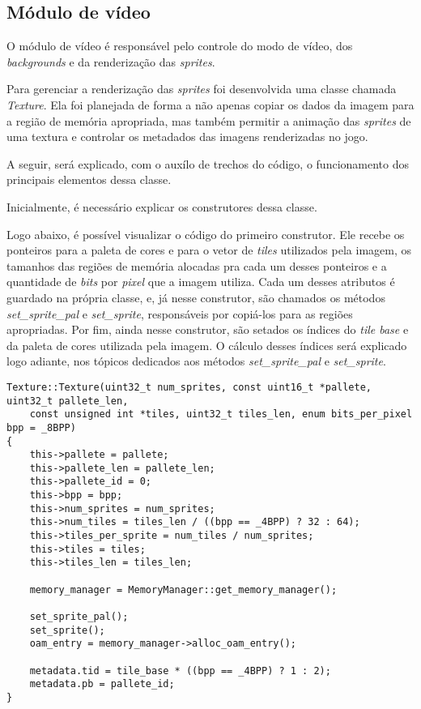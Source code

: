 \subsection{Módulo de vídeo}

O módulo de vídeo é responsável pelo controle do modo de vídeo, dos \textit{backgrounds} e da renderização das \textit{sprites}.

Para gerenciar a renderização das \textit{sprites} foi desenvolvida uma classe chamada \textit{Texture}. Ela foi planejada de forma a não apenas copiar os dados da imagem para a região de memória apropriada, mas também permitir a animação das \textit{sprites} de uma textura e controlar os metadados das imagens renderizadas no jogo.

A seguir, será explicado, com o auxílo de trechos do código, o funcionamento dos principais elementos dessa classe.

Inicialmente, é necessário explicar os construtores dessa classe.

Logo abaixo, é possível visualizar o código do primeiro construtor. Ele recebe os ponteiros para a paleta de cores e para o vetor de \textit{tiles} utilizados pela imagem, os tamanhos das regiões de memória alocadas pra cada um desses ponteiros e a quantidade de \textit{bits} por \textit{pixel} que a imagem utiliza. Cada um desses atributos é guardado na própria classe, e, já nesse construtor, são chamados os métodos \textit{set\_sprite\_pal} e \textit{set\_sprite}, responsáveis por copiá-los para as regiões apropriadas. Por fim, ainda nesse construtor, são setados os índices do \textit{tile base} e da paleta de cores utilizada pela imagem. O cálculo desses índices será explicado logo adiante, nos tópicos dedicados aos métodos \textit{set\_sprite\_pal} e \textit{set\_sprite}.

\begin{lstlisting}[float,caption={Construtor da classe \textit{Texture}.}]
Texture::Texture(uint32_t num_sprites, const uint16_t *pallete, uint32_t pallete_len,
    const unsigned int *tiles, uint32_t tiles_len, enum bits_per_pixel bpp = _8BPP)
{
    this->pallete = pallete;
    this->pallete_len = pallete_len;
    this->pallete_id = 0;
    this->bpp = bpp;
    this->num_sprites = num_sprites;
    this->num_tiles = tiles_len / ((bpp == _4BPP) ? 32 : 64);
    this->tiles_per_sprite = num_tiles / num_sprites;
    this->tiles = tiles;
    this->tiles_len = tiles_len;

    memory_manager = MemoryManager::get_memory_manager();

    set_sprite_pal();
    set_sprite();
    oam_entry = memory_manager->alloc_oam_entry();

    metadata.tid = tile_base * ((bpp == _4BPP) ? 1 : 2);
    metadata.pb = pallete_id;
}
\end{lstlisting}

